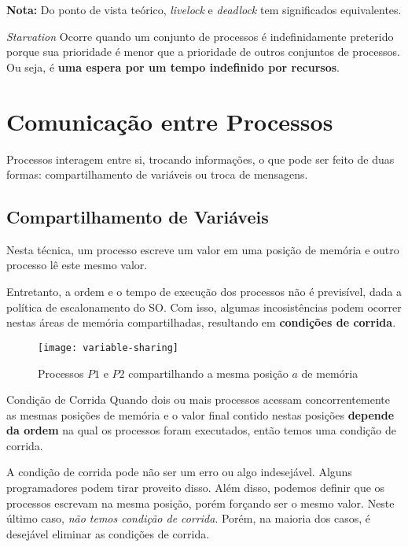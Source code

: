 \textbf{Nota:} Do ponto de vista teórico, \textit{livelock} e \textit{deadlock} tem significados equivalentes.

\begin{definicao}{\textit{Starvation}}
  Ocorre quando um conjunto de processos é indefinidamente preterido porque sua prioridade é menor que a prioridade de outros conjuntos de processos. Ou seja, é \textbf{uma espera por um tempo indefinido por recursos}.
\end{definicao}










\section{Comunicação entre Processos}
Processos interagem entre si, trocando informações, o que pode ser feito de duas formas: compartilhamento de variáveis ou troca de mensagens.


\subsection{Compartilhamento de Variáveis}
Nesta técnica, um processo escreve um valor em uma posição de memória e outro processo lê este mesmo valor.

Entretanto, a ordem e o tempo de execução dos processos não é previsível, dada a política de escalonamento do SO. Com isso, algumas incosistências podem ocorrer nestas áreas de memória compartilhadas, resultando em \textbf{condições de corrida}.

\begin{figure}
  \centering
  \texttt{[image: variable-sharing]}
  \caption{Processos $P1$ e $P2$ compartilhando a mesma posição $a$ de memória}
  \label{fig:variable-sharing}
\end{figure}

\begin{definicao}{Condição de Corrida}
  Quando dois ou mais processos acessam concorrentemente as mesmas posições de memória e o valor final contido nestas posições \textbf{depende da ordem} na qual os processos foram executados, então temos uma condição de corrida.
\end{definicao}

A condição de corrida pode não ser um erro ou algo indesejável. Alguns programadores podem tirar proveito disso. Além disso, podemos definir que os processos escrevam na mesma posição, porém forçando ser o mesmo valor. Neste último caso, \textit{não temos condição de corrida}. Porém, na maioria dos casos, é desejável eliminar as condições de corrida.





